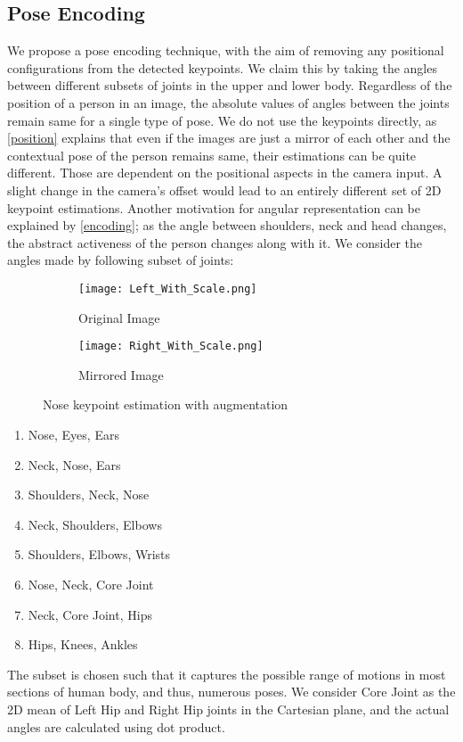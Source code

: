 \documentclass[sigconf]{acmart}
\begin{document}
\subsection{Pose Encoding}\label{pe}
We propose a pose encoding technique, with the aim of removing any positional configurations from the detected keypoints. We claim this by taking the angles between different subsets of joints in the upper and lower body. Regardless of the position of a person in an image, the absolute values of angles between the joints remain same for a single type of pose. We do not use the keypoints directly, as \autoref{position} explains that even if the images are just a mirror of each other and the contextual pose of the person remains same, their estimations can be quite different. Those are dependent on the positional aspects in the camera input. A slight change in the camera's offset would lead to an entirely different set of 2D keypoint estimations. Another motivation for angular representation can be explained by \autoref{encoding}; as the angle between shoulders, neck and head changes, the abstract activeness of the person changes along with it. We consider the angles made by following subset of joints:
\begin{figure}[ht]
 \begin{subfigure}{0.4\linewidth}
  \centering
  \texttt{[image: Left\_With\_Scale.png]}
  \caption{Original Image}
  \label{left}
 \end{subfigure}
 \begin{subfigure}{0.4\linewidth}
  \centering
  \texttt{[image: Right\_With\_Scale.png]}
  \caption{Mirrored Image}
  \label{right}
 \end{subfigure}
\vspace{-0.25cm}
\caption{Nose keypoint estimation with augmentation}
\label{position}
\end{figure}

\begin{enumerate}
    \item Nose, Eyes, Ears
    \item Neck, Nose, Ears
    \item Shoulders, Neck, Nose
    \item Neck, Shoulders, Elbows
    \item Shoulders, Elbows, Wrists
    \item Nose, Neck, Core Joint
    \item Neck, Core Joint, Hips
    \item Hips, Knees, Ankles
\end{enumerate}
The subset is chosen such that it captures the possible range of motions in most sections of human body, and thus, numerous poses. We consider Core Joint as the 2D mean of Left Hip and Right Hip joints in the Cartesian plane, and the actual angles are calculated using dot product.
\end{document}
